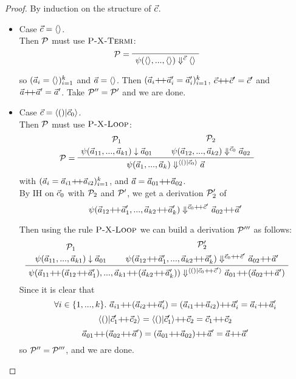 \begin{proof}
\def\cc{\c {\++} \c'}
\def\aap#1{\a_{#1} {\++} \a_{#1}'}

	By induction on the structure of $\vec c$. 
	\begin{itemize}
		\item Case $\vec c = \langle \rangle$. \\
		Then $\mathcal{P}$ must use $\textsc{P-X-Termi}$:
		$$\PT{\LeLa{\MP = }
			  \Axiom{\sevalf{\emptyv}{\emptyv}{\c}{\emptyv}}
		  }$$
		
		so $(\vec a_i=\langle \rangle)^k_{i=1}$ and $\vec a = \langle \rangle$.
		Then $\k{\aap{i} = \a_i'}$, $\cc = \c' $ and $\a {\++} \a' = \a'$. Take $\mathcal{P}''
		= \mathcal{P}'$ and we are done. 
		
		\item Case $\c = \< () | \c_0 \'>$. \\ 
		Then $\mathcal{P}$ must use $\textsc{P-X-Loop}$: 
		$$
		\PT{
			\UCN{\MP_1}{\block{\a_{11}}{\a_{k1}}{\a_{01}}}
			\UCN{\MP_2}{\sevalf{\a_{12}}{\a_{k2}}{\c_0}{\a_{02}}}
 			\LeLa{\MP = }
			\BC{\sevalf{\a_1}{\a_k}{\< () | \c_0 \'>}{\a}}
		}$$
	    with $\k{\a_i = \vapp{\a_{i1}}{\a_{i2}}}$, and $\a = \a_{01} {\++} \a_{02}$.\\
	    
	    By IH on $\vec c_0$ with $\mathcal{P}_2$ and $\mathcal{P}'$, we get a derivation $\mathcal{P}'_2$ of 
	    $$\sevalfg{\lcall}{\a_{12} {\++} \a_1',...,\a_{k2} {\++} \a_k'}{\c_0 {\++} \c' }{\a_{02} {\++} \a'}$$
	    
	    Then using the rule $\textsc{P-X-Loop}$ we can build a derivation $\mathcal{P}'''$ as follows:
	    	$$
	    \PT{
	    	\UCN{\MP_{1}}{\block{\a_{11}}{\a_{k1}}{\a_{01}}}
	    	\UCN{\MP'_{2}}{\sevalfg{\lcall}{\a_{12} {\++} \a_1',...,\a_{k2} {\++} \a_k'}{\c_0 {\++} \c' }{\a_{02} {\++} \a'}}
	    	\BC{\sevalf{\a_{11} {\++} {(\a_{12} {\++} \a_1')}}
	    		        {\a_{k1} {\++} {(\a_{k2} {\++} \a_k')}}
	    		        {\< () | \c_0 {\++} \c' \'>}
	    		        {\a_{01} {\++} {(\a_{02} {\++} \a')}}}
	    }$$
	    Since it is clear that 
	    $$\forall i \in \{1,...,k\}. \ \a_{i1} {\++} (\a_{i2} {\++} \a_i') = (\a_{i1} {\++} \a_{i2}) {\++} \a_i' = \a_i {\++} \a_i' $$
	    $$ \< () | \c_1' {\++} \c_2 \'> = \< () | \c_1' \'> {\++} \c_2 = \c_1 {\++} \c_2 $$
	    $$ \a_{01} {\++} (\a_{02} {\++} \a') = (\a_{01} {\++} \a_{02}) {\++} \a' = \a {\++}  \a' $$
	    so  $\mathcal{P}'' = \mathcal{P}'''$, and we are done. 
	    
	\end{itemize}
	
\end{proof}


